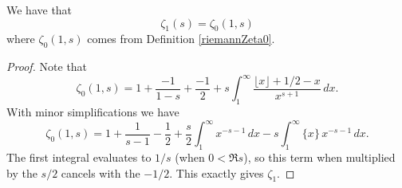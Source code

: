 \begin{theorem}
\label{Zeta1AltFormula}
\leanok
We have that
    $$\zeta_1(s)=\zeta_0(1,s)$$
    where $\zeta_0(1,s)$ comes from Definition \ref{riemannZeta0}.
\end{theorem}
\begin{proof}
\leanok
Note that
    $$\zeta_0(1,s)=1+\frac{-1}{1-s}+\frac{-1}{2}+
      s\int_1^\infty\frac{\lfloor x\rfloor+1/2-x}{x^{s+1}}\,dx.$$
    With minor simplifications we have
    $$\zeta_0(1,s)=1+\frac{1}{s-1}-\frac{1}{2}+
      \frac{s}{2}\int_1^\infty x^{-s-1}\,dx-s\int_1^\infty\{x\}\,x^{-s-1}\,dx.$$
    The first integral evaluates to $1/s$ (when $0<\mathfrak{R}s$), so this term when multiplied
    by the $s/2$ cancels with the $-1/2$. This exactly gives $\zeta_1$.
\end{proof}
